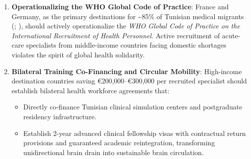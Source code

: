 \documentclass[
  11pt,
  a4paper]{article}
\providecommand{\tightlist}{%
  \setlength{\itemsep}{0pt}\setlength{\parskip}{0pt}}
\begin{document}
\begin{enumerate}
\def\labelenumi{\arabic{enumi}.}
\tightlist
\item
  \textbf{Operationalizing the WHO Global Code of Practice}: France and
  Germany, as the primary destinations for \textasciitilde85\% of
  Tunisian medical migrants (; ), should
  actively operationalize the \emph{WHO Global Code of Practice on the
  International Recruitment of Health Personnel}. Active recruitment of
  acute-care specialists from middle-income countries facing domestic
  shortages violates the spirit of global health solidarity.
\item
  \textbf{Bilateral Training Co-Financing and Circular Mobility}:
  High-income destination countries saving €200,000--€300,000 per
  recruited specialist should establish bilateral health workforce
  agreements that:

  \begin{itemize}
  \tightlist
  \item
    Directly co-finance Tunisian clinical simulation centers and
    postgraduate residency infrastructure.
  \item
    Establish 2-year advanced clinical fellowship visas with contractual
    return provisions and guaranteed academic reintegration,
    transforming unidirectional brain drain into sustainable brain
    circulation.
  \end{itemize}
\end{enumerate}
\end{document}
